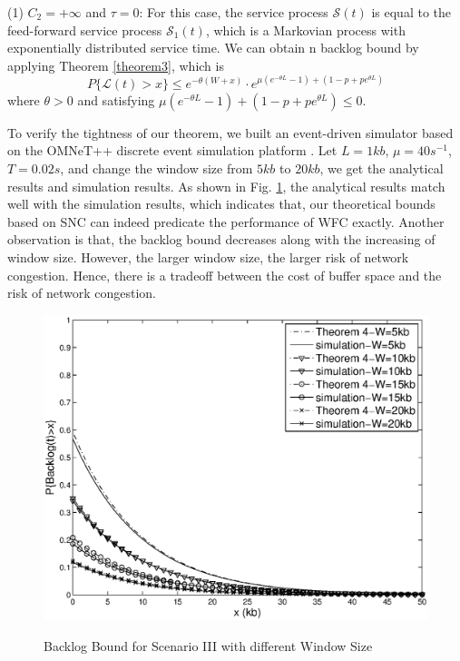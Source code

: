 \documentclass[12pt]{article}
\begin{document}
(1) $C_2=+\infty$ and $\tau=0$: For this case, the service process $\mathcal{S}(t)$ is equal to the feed-forward service process $\mathcal{S}_1(t)$, which is a Markovian process with exponentially distributed service time. We can obtain n backlog bound by applying Theorem \ref{theorem3}, which is
\begin{equation*}\label{equation3}
P\{\mathcal{L}(t)>x\}\leq e^{-\theta(W+x)}\cdot e^{\mu(e^{-\theta L}-1)+(1-p+pe^{\theta L})}
\end{equation*}
where $\theta>0$ and satisfying $\mu(e^{-\theta L}-1)+(1-p+pe^{\theta L})\leq 0$.

To verify the tightness of our theorem, we built an event-driven simulator based on the OMNeT++ discrete event simulation platform \cite{omnetpp}. Let $L=1kb$, $\mu=40s^{-1}$, $T=0.02s$, and change the window size from $5kb$ to $20kb$, we get the analytical results and simulation results. As shown in Fig. \ref{result1}, the analytical results match well with the simulation results, which indicates that, our theoretical bounds based on SNC can indeed predicate the performance of WFC exactly. Another observation is that, the backlog bound decreases along with the increasing of window size. However, the larger window size, the larger risk of network congestion. Hence, there is a tradeoff between the cost of buffer space and the risk of network congestion.
\begin{figure}
  \centering
  \includegraphics[scale=0.45]{figures/backlogbuf.eps}\\
  \caption{Backlog Bound for Scenario III with different Window Size}\label{result1}
\end{figure}
\end{document}
